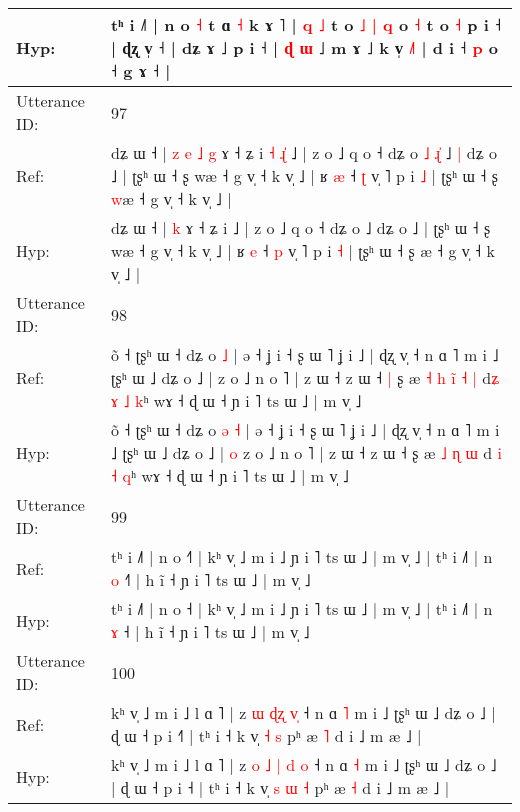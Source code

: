 \documentclass[10pt]{article}
\DeclareRobustCommand{\hl}[1]{{\textcolor{red}{#1}}}
\begin{document}
\begin{longtable}{ll}
 \\
Hyp: & tʰ i ˩˥ | n o \hl{˧} t ɑ \hl{˧} k ɤ ˥ | \hl{q} \hl{}\hl{˩} t o\hl{ }\hl{˩}\hl{ }\hl{|} \hl{q} o\hl{ }\hl{˧} t o\hl{ }\hl{˧} p i ˧ | ɖʐ v̩ ˧ | dʑ ɤ ˩ p i ˧ | \hl{}\hl{ɖ} \hl{ɯ} ˩ m ɤ ˩ k v̩ \hl{˩}˥ | d i ˧ \hl{p} o ˧ g ɤ ˧ |
 \\
\midrule
Utterance ID: & 97 \\
Ref: & dʑ ɯ ˧ |\hl{ }\hl{z}\hl{ }\hl{e}\hl{ }\hl{˩} \hl{g} ɤ ˧ ʑ i\hl{ }\hl{˧}\hl{ }\hl{ɻ}\hl{̍} ˩ | z o ˩ q o ˧ dʑ o\hl{ }\hl{˩}\hl{ }\hl{ɻ}\hl{̍} ˩\hl{ }\hl{|} dʑ o ˩ | ʈʂʰ ɯ ˧ ʂ wæ ˧ g v̩ ˧ k v̩ ˩ | ʁ \hl{æ} ˧ \hl{ʈ} v̩ ˥ p i \hl{˩} | ʈʂʰ ɯ ˧ ʂ \hl{w}æ ˧ g v̩ ˧ k v̩ ˩ |
 \\
Hyp: & dʑ ɯ ˧ |\hl{}\hl{}\hl{}\hl{}\hl{}\hl{} \hl{k} ɤ ˧ ʑ i\hl{}\hl{}\hl{}\hl{}\hl{} ˩ | z o ˩ q o ˧ dʑ o\hl{}\hl{}\hl{}\hl{}\hl{} ˩\hl{}\hl{} dʑ o ˩ | ʈʂʰ ɯ ˧ ʂ wæ ˧ g v̩ ˧ k v̩ ˩ | ʁ \hl{e} ˧ \hl{p} v̩ ˥ p i \hl{˧} | ʈʂʰ ɯ ˧ ʂ \hl{}æ ˧ g v̩ ˧ k v̩ ˩ |
 \\
\midrule
Utterance ID: & 98 \\
Ref: & õ ˧ ʈʂʰ ɯ ˧ dʑ o\hl{}\hl{} \hl{˩} | ə ˧ ʝ i ˧ ʂ ɯ ˥ ʝ i ˩ | ɖʐ v̩ ˧ n ɑ ˥ m i ˩ ʈʂʰ ɯ ˩ dʑ o ˩ |\hl{}\hl{} z o ˩ n o ˥ | z ɯ ˧ z ɯ ˧\hl{ }\hl{|} ʂ æ\hl{ }\hl{˧}\hl{ }\hl{h} \hl{i}\hl{̃} \hl{˧} \hl{|} d\hl{ʑ} \hl{ɤ} \hl{˩} \hl{k}ʰ wɤ ˧ ɖ ɯ ˧ ɲ i ˥ ts ɯ ˩ | m v̩ ˩
 \\
Hyp: & õ ˧ ʈʂʰ ɯ ˧ dʑ o\hl{ }\hl{ə} \hl{˧} | ə ˧ ʝ i ˧ ʂ ɯ ˥ ʝ i ˩ | ɖʐ v̩ ˧ n ɑ ˥ m i ˩ ʈʂʰ ɯ ˩ dʑ o ˩ |\hl{ }\hl{o} z o ˩ n o ˥ | z ɯ ˧ z ɯ ˧\hl{}\hl{} ʂ æ\hl{}\hl{}\hl{}\hl{} \hl{}\hl{˩} \hl{ɳ} \hl{ɯ} d\hl{} \hl{i} \hl{˧} \hl{q}ʰ wɤ ˧ ɖ ɯ ˧ ɲ i ˥ ts ɯ ˩ | m v̩ ˩
 \\
\midrule
Utterance ID: & 99 \\
Ref: & tʰ i ˩˥ | n o ˧\hl{˥} | kʰ v̩ ˩ m i ˩ ɲ i ˥ ts ɯ ˩ | m v̩ ˩ | tʰ i ˩˥ | n \hl{o} ˧\hl{˥} | h ĩ ˧ ɲ i ˥ ts ɯ ˩ | m v̩ ˩
 \\
Hyp: & tʰ i ˩˥ | n o ˧\hl{} | kʰ v̩ ˩ m i ˩ ɲ i ˥ ts ɯ ˩ | m v̩ ˩ | tʰ i ˩˥ | n \hl{ɤ} ˧\hl{} | h ĩ ˧ ɲ i ˥ ts ɯ ˩ | m v̩ ˩
 \\
\midrule
Utterance ID: & 100 \\
Ref: & kʰ v̩ ˩ m i ˩ l ɑ ˥ | z \hl{ɯ} \hl{}\hl{ɖ}\hl{ʐ} \hl{}\hl{v}\hl{̩} ˧ n ɑ \hl{˥} m i ˩ ʈʂʰ ɯ ˩ dʑ o ˩ | ɖ ɯ ˧ p i ˧\hl{˥} | tʰ i ˧ k v̩\hl{}\hl{} \hl{˧} \hl{s} pʰ æ \hl{˥} d i ˩ m æ ˩ |
 \\
Hyp: & kʰ v̩ ˩ m i ˩ l ɑ ˥ | z \hl{o} \hl{˩}\hl{ }\hl{|} \hl{d}\hl{ }\hl{o} ˧ n ɑ \hl{˧} m i ˩ ʈʂʰ ɯ ˩ dʑ o ˩ | ɖ ɯ ˧ p i ˧\hl{} | tʰ i ˧ k v̩\hl{ }\hl{s} \hl{ɯ} \hl{˧} pʰ æ \hl{˧} d i ˩ m æ ˩ |

\end{longtable}
\end{document}
